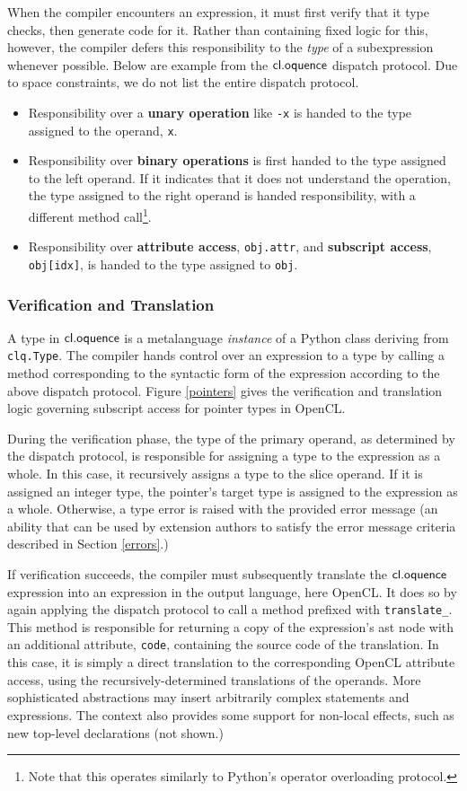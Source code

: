 \documentclass[10pt, conference, compsocconf]{IEEEtran}
\begin{document}
When the compiler encounters an expression, it must first verify that it type checks, then generate code for it. Rather than containing fixed logic for this, however, the compiler defers this responsibility to the {\it type} of a subexpression whenever possible. Below are example from the $\textsf{cl.oquence}$ dispatch protocol. Due to space constraints, we do not list the entire dispatch protocol.
\begin{itemize}
\item Responsibility over a {\bf unary operation} like \verb|-x| is handed to the type assigned to the operand, \verb|x|.
\item Responsibility over {\bf binary operations} is first handed to the type assigned to the left operand. If it indicates that it does not understand the operation, the type assigned to the right operand is handed responsibility, with a different method call\footnote{Note that this operates similarly to Python's operator overloading protocol.}.
\item Responsibility over {\bf attribute access}, \texttt{obj.attr}, and {\bf subscript access}, \texttt{obj[idx]}, is handed to the type assigned to \texttt{obj}.
\end{itemize}

\subsubsection{Verification and Translation}
A type in $\textsf{cl.oquence}$ is a metalanguage {\it instance} of a Python class deriving from \verb|clq.Type|. The compiler hands control over an expression to a type by calling a method corresponding to the syntactic form of the expression according to the above dispatch protocol. Figure \ref{pointers} gives the verification and translation logic governing subscript access for pointer types in OpenCL.

During the verification phase, the type of the primary operand, as determined by the dispatch protocol, is responsible for assigning a type to the expression as a whole. In this case, it recursively assigns a type to the slice operand. If it is assigned an integer type, the pointer's target type is assigned to the expression as a whole. Otherwise, a type error is raised with the provided error message (an ability that can be used by extension authors to satisfy the error message criteria described in Section \ref{errors}.) 

If verification succeeds, the compiler must subsequently translate the $\textsf{cl.oquence}$ expression into an expression in the output language, here OpenCL. It does so by again applying the dispatch protocol to call a method prefixed with \verb|translate_|. This method is responsible for returning a copy of the expression's ast node with an additional attribute, \verb|code|, containing the source code of the translation. In this case, it is simply a direct translation to the corresponding OpenCL attribute access, using the recursively-determined translations of the operands. More sophisticated abstractions may insert arbitrarily complex statements and expressions. The context also provides some support for non-local effects, such as new top-level declarations (not shown.)
\end{document}
